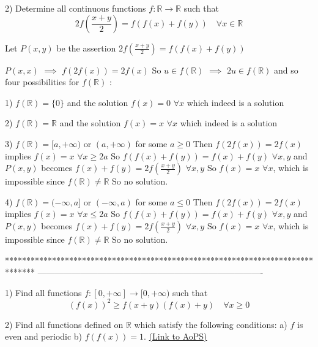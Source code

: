 \begin{solution}
	\begin{tcolorbox}2) Determine all continuous functions $f: \mathbb R\to\mathbb R$  such that 
\[2f\left( \frac{ x + y}{ 2}\right) = f(f (x ) + f ( y) ) \quad \forall x\in\mathbb R\]\end{tcolorbox}
Let $P(x,y)$ be the assertion $2f(\frac{x+y}2)=f(f(x)+f(y))$

$P(x,x)$ $\implies$ $f(2f(x))=2f(x)$
So $u\in f(\mathbb R)$ $\implies$ $2u\in f(\mathbb R)$ and so four possibilities for $f(\mathbb R)$ :

1) $f(\mathbb R)=\{0\}$ and the solution $\boxed{f(x)=0}$ $\forall x$ which indeed is a solution

2) $f(\mathbb R)=\mathbb R$ and the solution ${\boxed{f(x)=x}}$ $\forall x$ which indeed is a solution

3) $f(\mathbb R)=[a,+\infty)$ or $(a,+\infty)$ for some $a\ge 0$
Then $f(2f(x))=2f(x)$ implies $f(x)=x$ $\forall x\ge 2a$
So $f(f(x)+f(y))=f(x)+f(y)$ $\forall x,y$ and $P(x,y)$ becomes $f(x)+f(y)=2f(\frac{x+y}2)$ $\forall x,y$
So $f(x)=x$ $\forall x$, which is impossible since  $f(\mathbb R)\ne\mathbb R$
So no solution.
 
4) $f(\mathbb R)=(-\infty,a]$ or $(-\infty,a)$ for some $a\le 0$
Then $f(2f(x))=2f(x)$ implies $f(x)=x$ $\forall x\le 2a$
So $f(f(x)+f(y))=f(x)+f(y)$ $\forall x,y$ and $P(x,y)$ becomes $f(x)+f(y)=2f(\frac{x+y}2)$ $\forall x,y$
So $f(x)=x$ $\forall x$, which is impossible since  $f(\mathbb R)\ne\mathbb R$
So no solution.
\end{solution}
*******************************************************************************
-------------------------------------------------------------------------------

\begin{problem}
	1) Find all functions $f:[0, + \infty] \to [0, + \infty)$ such that 
\[(f (x)) ^ 2\geq f (x + y) (f (x) + y) \quad \forall x\geq 0\]

2) Find all functions defined on $\mathbb R$ which satisfy the following conditions:
a) $f$ is even and periodic
b) $f(f(x)) = 1$.
	\flushright \href{https://artofproblemsolving.com/community/c6h566943}{(Link to AoPS)}
\end{problem}



